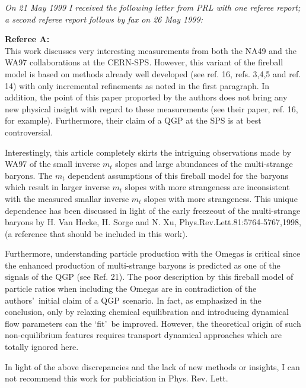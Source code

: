 \noindent \textit{On 21 May 1999 I received the following letter from PRL with one referee report; a second referee report follows by fax on 26 May 1999:}\\[-0.7cm]
%
\begin{mdframed}[linecolor=gray,roundcorner=12pt,backgroundcolor=GreenYellow!15,linewidth=1pt,leftmargin=0cm,rightmargin=0cm,topline=true,bottomline=true,skipabove=12pt]
\relax%
%


{\bf Referee A:}\\
This work discusses very interesting measurements from both the NA49 and the WA97 collaborations at the CERN-SPS. However, this variant of the fireball model is based on methods already well developed (see ref. 16, refs. 3,4,5 and ref. 14) with only incremental refinements as noted in the first paragraph. In addition, the point of this paper proported by the authors does not bring any new physical insight with regard to these measurements (see their paper, ref. 16, for example). Furthermore,  their claim of a QGP at the SPS is at best controversial.

Interestingly, this article completely skirts the intriguing observations made by WA97 of the small inverse $m_t$ slopes and large abundances of the multi-strange baryons. The $m_t$ dependent assumptions of this fireball model for the baryons which result in larger inverse $m_t$ slopes with more strangeness are inconsistent with the measured smallar inverse $m_t$ slopes with more strangeness. This unique dependence has been discussed in light of the early freezeout of the multi-strange baryons by H. Van Hecke, H. Sorge and N. Xu, Phys.Rev.Lett.81:5764-5767,1998, (a reference that should be included in this work).

Furthermore, understanding particle production with the Omegas is critical since the enhanced production of multi-strange baryons is predicted as one of the signals of the QGP (see Ref. 21). The poor description by this fireball model of particle ratios when including the Omegas are in contradiction of the authors\rq\ initial claim of a QGP scenario. In fact, as emphasized in the conclusion, only by relaxing chemical equilibration and introducing dynamical flow parameters can the \lq fit\rq\ be improved. However, the theoretical origin of such non-equilibrium features requires transport dynamical approaches which are totally ignored here.

In light of the above discrepancies and the lack of new methods or insights, I can not recommend this work for publiciation in Phys. Rev. Lett.
\end{mdframed}
\vskip 0.5cm 
 

